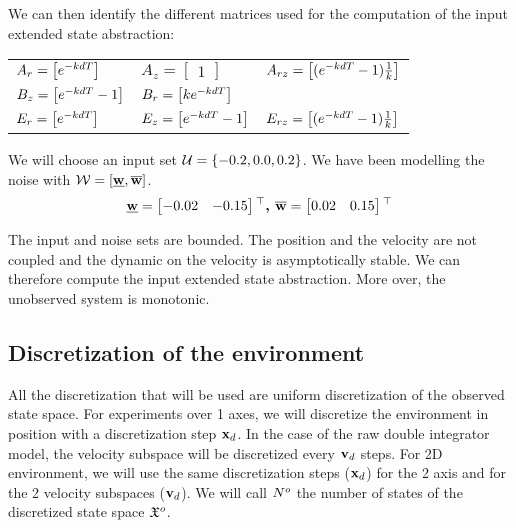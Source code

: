 We can then identify the different matrices used for the computation of the input extended state abstraction:\\
\begin{tabular}{lll}
$A_r =  \begin{bmatrix} e^{-kdT} \end{bmatrix} $
&
$A_z =  \begin{bmatrix} 1 \end{bmatrix} $
&
$A_{rz} =  \begin{bmatrix} (e^{-k dT} - 1)\frac{1}{k} \end{bmatrix}$
\\
$B_z =  \begin{bmatrix} e^{-k dT} - 1 \end{bmatrix} $
&
$B_r =  \begin{bmatrix} k e^{-kdT} \end{bmatrix} $
&
\\
$E_r =  \begin{bmatrix} e^{-kdT} \end{bmatrix} $
&
$E_z =  \begin{bmatrix} e^{-k dT} - 1 \end{bmatrix} $
&
$E_{rz} =  \begin{bmatrix} (e^{-k dT} - 1)\frac{1}{k} \end{bmatrix}$
\end{tabular}

We will choose an input set $\mathcal{U} = \{-0.2,0.0,0.2\}$.
We have been modelling the noise with $\mathcal{W} = [\underline{ \mathbf{w}},\overline{ \mathbf{w}}]$.
\begin{equation}
\underline{ \mathbf{w}} = \begin{bmatrix} -0.02&-0.15 \end{bmatrix} {}^\top
\textbf{, }
\overline{ \mathbf{w}} = \begin{bmatrix}  0.02& 0.15 \end{bmatrix} {}^\top
\end{equation}

The input and noise sets are bounded. The position and the velocity are not coupled and the dynamic on the velocity is asymptotically stable.
We can therefore compute the input extended state abstraction. More over, the unobserved system is monotonic.

\subsection{Discretization of the environment}
All the discretization that will be used are uniform discretization of the observed state space.
For experiments over 1 axes, we will discretize the environment in position with a discretization step $ \mathbf{x}_d$. In the case of the raw double integrator model, the velocity subspace will be discretized every $ \mathbf{v}_d$ steps.
For 2D environment, we will use the same discretization steps ($ \mathbf{x}_d$) for the 2 axis and for the 2 velocity subspaces ($ \mathbf{v}_d$).
We will call $N^o$ the number of states of the discretized state space $\mathfrak{X}^o$.

